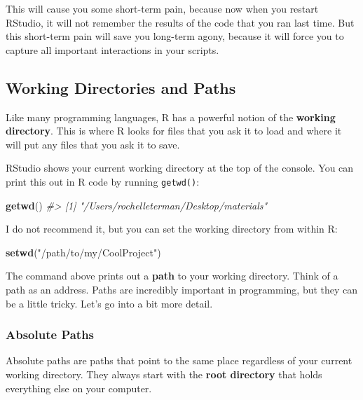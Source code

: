 \documentclass[
]{book}
\newenvironment{Shaded}{\begin{snugshade}}{\end{snugshade}}
\newcommand{\CommentTok}[1]{\textcolor[rgb]{0.56,0.35,0.01}{\textit{#1}}}
\newcommand{\KeywordTok}[1]{\textcolor[rgb]{0.13,0.29,0.53}{\textbf{#1}}}
\newcommand{\NormalTok}[1]{#1}
\newcommand{\StringTok}[1]{\textcolor[rgb]{0.31,0.60,0.02}{#1}}
\begin{document}
This will cause you some short-term pain, because now when you restart RStudio, it will not remember the results of the code that you ran last time. But this short-term pain will save you long-term agony, because it will force you to capture all important interactions in your scripts.

\hypertarget{working-directories-and-paths}{%
\subsection{Working Directories and Paths}\label{working-directories-and-paths}}

Like many programming languages, R has a powerful notion of the \textbf{working directory}. This is where R looks for files that you ask it to load and where it will put any files that you ask it to save.

RStudio shows your current working directory at the top of the console. You can print this out in R code by running \texttt{getwd()}:

\begin{Shaded}
\begin{Highlighting}[]
\KeywordTok{getwd}\NormalTok{()}
\CommentTok{#> [1] "/Users/rochelleterman/Desktop/materials"}
\end{Highlighting}
\end{Shaded}

I do not recommend it, but you can set the working directory from within R:

\begin{Shaded}
\begin{Highlighting}[]
\KeywordTok{setwd}\NormalTok{(}\StringTok{"/path/to/my/CoolProject"}\NormalTok{)}
\end{Highlighting}
\end{Shaded}

The command above prints out a \textbf{path} to your working directory. Think of a path as an address. Paths are incredibly important in programming, but they can be a little tricky. Let's go into a bit more detail.

\hypertarget{absolute-paths}{%
\subsubsection*{Absolute Paths}\label{absolute-paths}}

Absolute paths are paths that point to the same place regardless of your current working directory. They always start with the \textbf{root directory} that holds everything else on your computer.
\end{document}
